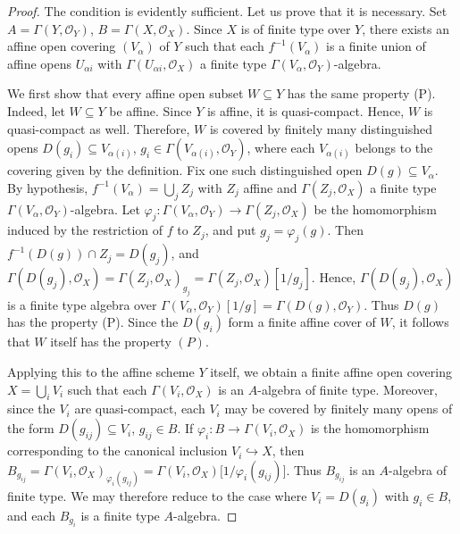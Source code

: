 \documentclass{article}
\begin{document}
\begin{proof}
The condition is evidently sufficient. Let us prove that it is necessary. Set \(A=\Gamma(Y,\mathcal O_Y)\), \(B=\Gamma(X,\mathcal O_X)\). Since \(X\) is of finite type over \(Y\), there exists an affine open covering \((V_\alpha)\) of \(Y\) such that each \(f^{-1}(V_\alpha)\) is a finite union of affine opens \(U_{\alpha i}\) with \(\Gamma(U_{\alpha i},\mathcal O_X)\) a finite type \(\Gamma(V_\alpha,\mathcal O_Y)\)-algebra. 

We first show that every affine open subset \(W\subseteq Y\) has the same property (P). Indeed, let \(W\subseteq Y\) be affine. Since \(Y\) is affine, it is quasi-compact. Hence, \(W\) is quasi-compact as well. Therefore, \(W\) is covered by finitely many distinguished opens \(D(g_i)\subseteq V_{\alpha(i)}\), \( g_i\in \Gamma(V_{\alpha(i)},\mathcal O_Y)\), where each \(V_{\alpha(i)}\) belongs to the covering given by the definition. Fix one such distinguished open \(D(g)\subseteq V_\alpha\). By hypothesis, \(f^{-1}(V_\alpha)=\bigcup_j Z_j\) with \(Z_j\) affine and \(\Gamma(Z_j,\mathcal O_X)\) a finite type \(\Gamma(V_\alpha,\mathcal O_Y)\)-algebra. Let \(\varphi_j:\Gamma(V_\alpha,\mathcal O_Y)\to \Gamma(Z_j,\mathcal O_X)\) be the homomorphism induced by the restriction of \(f\) to \(Z_j\), and put \(g_j=\varphi_j(g)\). Then \(f^{-1}(D(g))\cap Z_j=D(g_j)\), and \(\Gamma(D(g_j),\mathcal O_X) = \Gamma(Z_j,\mathcal O_X)_{g_j} = \Gamma(Z_j,\mathcal O_X)[1/g_j]\). Hence, \(\Gamma(D(g_j),\mathcal O_X)\) is a finite type algebra over \(\Gamma(V_\alpha,\mathcal O_Y)[1/g] = \Gamma(D(g),\mathcal O_Y)\). Thus \(D(g)\) has the property (P). Since the \(D(g_i)\) form a finite affine cover of \(W\), it follows that \(W\) itself has the property \((P)\).

Applying this to the affine scheme \(Y\) itself, we obtain a finite affine open covering \(X=\bigcup_i V_i\) such that each \(\Gamma(V_i,\mathcal O_X)\) is an \(A\)-algebra of finite type. Moreover, since the \(V_i\) are quasi-compact, each \(V_i\) may be covered by finitely many opens of the form \(D(g_{ij})\subseteq V_i\), \(g_{ij}\in B\). If \(\varphi_i:B\to \Gamma(V_i,\mathcal O_X)\) is the homomorphism corresponding to the canonical inclusion \(V_i\hookrightarrow X\), then \(B_{g_{ij}} = \Gamma(V_i,\mathcal O_X)_{\varphi_i(g_{ij})} = \Gamma(V_i,\mathcal O_X)\bigl[1/\varphi_i(g_{ij})\bigr] \).
Thus \(B_{g_{ij}}\) is an \(A\)-algebra of finite type. We may therefore reduce to the case where \(V_i=D(g_i)\) with \(g_i\in B\), and each \(B_{g_i}\) is a finite type \(A\)-algebra.


\end{proof}
\end{document}
